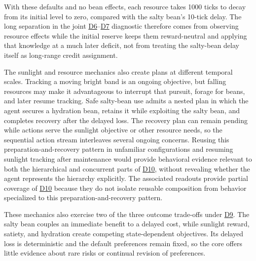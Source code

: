 \documentclass[10pt,journal,compsoc]{IEEEtran}
\DeclareRobustCommand{\Dref}[1]{\hyperref[sec:d#1]{D#1}}
\begin{document}
With these defaults and no bean effects, each resource takes 1000 ticks to decay from its initial level to zero, compared with the salty bean's 10-tick delay.
The long separation in the joint \Dref{6}--\Dref{7} diagnostic therefore comes from observing resource effects while the initial reserve keeps them reward-neutral and applying that knowledge at a much later deficit, not from treating the salty-bean delay itself as long-range credit assignment.

The sunlight and resource mechanics also create plans at different temporal scales.
Tracking a moving bright band is an ongoing objective, but falling resources may make it advantageous to interrupt that pursuit, forage for beans, and later resume tracking.
Safe salty-bean use admits a nested plan in which the agent secures a hydration bean, retains it while exploiting the salty bean, and completes recovery after the delayed loss.
The recovery plan can remain pending while actions serve the sunlight objective or other resource needs, so the sequential action stream interleaves several ongoing concerns.
Reusing this preparation-and-recovery pattern in unfamiliar configurations and resuming sunlight tracking after maintenance would provide behavioral evidence relevant to both the hierarchical and concurrent parts of \Dref{10}, without revealing whether the agent represents the hierarchy explicitly.
The associated readouts provide partial coverage of \Dref{10} because they do not isolate reusable composition from behavior specialized to this preparation-and-recovery pattern.

These mechanics also exercise two of the three outcome trade-offs under \Dref{9}.
The salty bean couples an immediate benefit to a delayed cost, while sunlight reward, satiety, and hydration create competing state-dependent objectives.
Its delayed loss is deterministic and the default preferences remain fixed, so the core offers little evidence about rare risks or continual revision of preferences.
\end{document}
